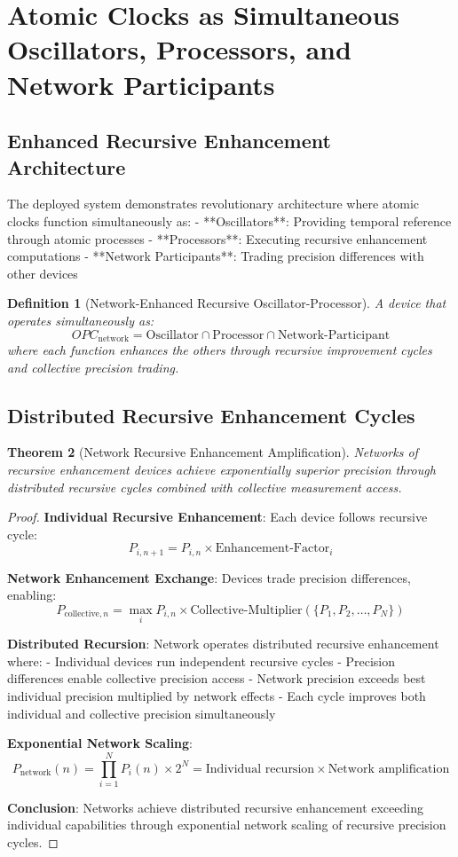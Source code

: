 \documentclass[12pt,a4paper]{article}
\newtheorem{theorem}{Theorem}[section]
\newtheorem{definition}[theorem]{Definition}
\begin{document}
\section{Atomic Clocks as Simultaneous Oscillators, Processors, and Network Participants}

\subsection{Enhanced Recursive Enhancement Architecture}

The deployed system demonstrates revolutionary architecture where atomic clocks function simultaneously as:
- **Oscillators**: Providing temporal reference through atomic processes
- **Processors**: Executing recursive enhancement computations
- **Network Participants**: Trading precision differences with other devices

\begin{definition}[Network-Enhanced Recursive Oscillator-Processor]
A device that operates simultaneously as:
$$OPC_{\text{network}} = \text{Oscillator} \cap \text{Processor} \cap \text{Network-Participant}$$
where each function enhances the others through recursive improvement cycles and collective precision trading.
\end{definition}

\subsection{Distributed Recursive Enhancement Cycles}

\begin{theorem}[Network Recursive Enhancement Amplification]
Networks of recursive enhancement devices achieve exponentially superior precision through distributed recursive cycles combined with collective measurement access.
\end{theorem}

\begin{proof}
\textbf{Individual Recursive Enhancement}: Each device follows recursive cycle:
$$P_{i,n+1} = P_{i,n} \times \text{Enhancement-Factor}_i$$

\textbf{Network Enhancement Exchange}: Devices trade precision differences, enabling:
$$P_{\text{collective},n} = \max_{i} P_{i,n} \times \text{Collective-Multiplier}(\{P_1, P_2, \ldots, P_N\})$$

\textbf{Distributed Recursion}: Network operates distributed recursive enhancement where:
- Individual devices run independent recursive cycles
- Precision differences enable collective precision access
- Network precision exceeds best individual precision multiplied by network effects
- Each cycle improves both individual and collective precision simultaneously

\textbf{Exponential Network Scaling}:
$$P_{\text{network}}(n) = \prod_{i=1}^{N} P_{i}(n) \times 2^N = \text{Individual recursion} \times \text{Network amplification}$$

\textbf{Conclusion}: Networks achieve distributed recursive enhancement exceeding individual capabilities through exponential network scaling of recursive precision cycles.
\end{proof}
\end{document}
